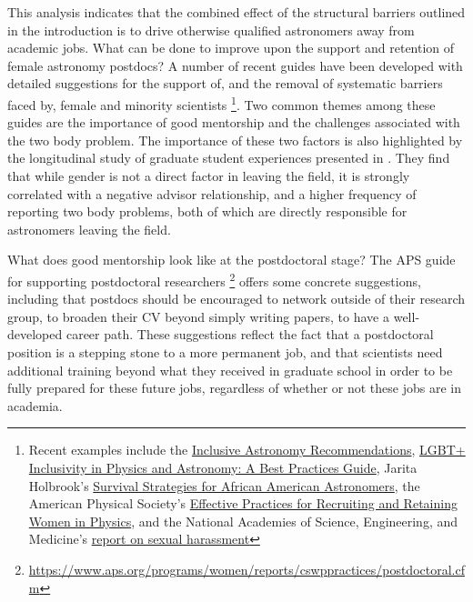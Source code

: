\documentclass[modern]{aastex62}
\begin{document}
This analysis indicates that the combined effect of the structural barriers outlined in the introduction is to drive otherwise qualified astronomers away from academic jobs. What can be done to improve upon the support and retention of female astronomy postdocs? A number of recent guides have been developed with detailed suggestions for the support of, and the removal of systematic barriers faced by, female and minority scientists \footnote{Recent examples include the \href{https://tiki.aas.org/tiki-index.php?page=Inclusive_Astronomy_The_Nashville_Recommendations}{Inclusive Astronomy Recommendations},  \href{https://arxiv.org/abs/1804.08406}{LGBT+ Inclusivity in Physics and Astronomy: A Best Practices Guide}, Jarita Holbrook's \href{https://arxiv.org/abs/1204.0247}{Survival Strategies for African American Astronomers}, the American Physical Society's \href{https://www.aps.org/programs/women/reports/cswppractices/index.cfm}{Effective Practices for Recruiting and Retaining Women in Physics}, and the National Academies of Science, Engineering, and Medicine's \href{https://doi.org/10.17226/24994}{report on sexual harassment}}. Two common themes among these guides are the importance of good mentorship and the challenges associated with the two body problem. The importance of these two factors is also highlighted by the longitudinal study of graduate student experiences presented in \citet{ivi16}. They find that while gender is not a direct factor in leaving the field, it is strongly correlated with a negative advisor relationship, and a higher frequency of reporting two body problems, both of which are directly responsible for astronomers leaving the field. 

What does good mentorship look like at the postdoctoral stage? The APS guide for supporting postdoctoral researchers \footnote{\url{https://www.aps.org/programs/women/reports/cswppractices/postdoctoral.cfm}} offers some concrete suggestions, including that postdocs should be encouraged to network outside of their research group, to broaden their CV beyond simply writing papers, to have a well-developed career path. These suggestions reflect the fact that a postdoctoral position is a stepping stone to a more permanent job, and that scientists need additional training beyond what they received in graduate school in order to be fully prepared for these future jobs, regardless of whether or not these jobs are in academia. 
\end{document}
